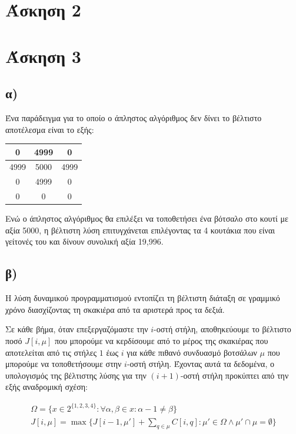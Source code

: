 \documentclass[11pt,a4paper]{book}
\begin{document}
\section*{Άσκηση 2}
\section*{Άσκηση 3}
\subsection*{α)}
Ένα παράδειγμα για το οποίο ο άπληστος αλγόριθμος δεν δίνει το βέλτιστο αποτέλεσμα είναι το εξής:

\vspace{3mm}
\begin{doublespace}
\begin{tabular}{|c|c|c|}
	\hline
	0    & 4999 & 0    \\ \hline
	4999 & 5000 & 4999 \\ \hline
	0    & 4999 & 0    \\ \hline
	0    &    0 & 0    \\ \hline
\end{tabular}
\end{doublespace}
\vspace{3mm}

Ενώ ο άπληστος αλγόριθμος θα επιλέξει να τοποθετήσει ένα βότσαλο
στο κουτί με αξία 5000, η βέλτιστη λύση επιτυγχάνεται επιλέγοντας
τα 4 κουτάκια που είναι γείτονές του και δίνουν συνολική αξία 19,996.

\subsection*{β)}
Η λύση δυναμικού προγραμματισμού εντοπίζει τη βέλτιστη διάταξη σε γραμμικό χρόνο διασχίζοντας τη σκακιέρα από τα αριστερά προς τα δεξιά.

Σε κάθε βήμα, όταν επεξεργαζόμαστε την $i$-οστή στήλη, αποθηκεύουμε το βέλτιστο ποσό $J[ i, \mu ]$ που μπορούμε να κερδίσουμε από το μέρος της σκακιέρας που αποτελείται από τις στήλες $1$ έως $i$ για κάθε πιθανό συνδυασμό βοτσάλων $\mu$ που μπορούμε να τοποθετήσουμε στην $i$-οστή στήλη. Έχοντας αυτά τα δεδομένα, ο υπολογισμός της βέλτιστης λύσης για την $(i + 1)$-οστή στήλη προκύπτει από την εξής αναδρομική σχέση:

\begin{align*}
	\Omega = \{ x \in 2^{\{1, 2, 3, 4\}}: \forall \alpha, \beta \in x: \alpha - 1 \neq \beta \}\\
	J[ i, \mu ] = \max\{J[ i - 1, \mu' ] + \sum_{q \in \mu}{C[ i, q ]}: \mu' \in \Omega \land \mu' \cap \mu = \emptyset\}
\end{align*}
\end{document}
